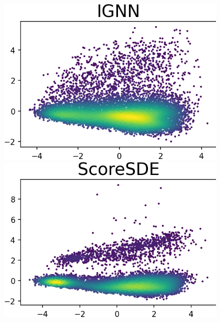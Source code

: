 \documentclass{article}
\theoremstyle{remark}
\theoremstyle{plain}
\begin{document}
{\begin{figure}[!t]
\begin{minipage}{0.16\textwidth}
    \end{minipage}
    \begin{minipage}{0.16\textwidth}
        \vspace{-0.2in}\includegraphics[width=\linewidth]{gas_PCA_2D_compare_IGNN.png}
    \end{minipage}
    \begin{minipage}{0.155\textwidth}
        \vspace{-0.2in}\includegraphics[width=\linewidth]{gas_PCA_2D_compare_ScoreSDE.png}
    \end{minipage}
    

\end{figure}}
\end{document}
